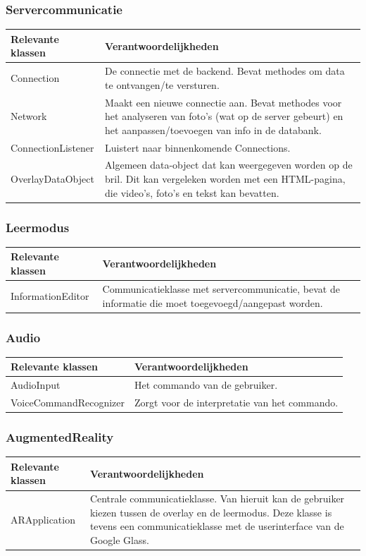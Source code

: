 \documentclass[12pt,a4paper,oneside]{article}
\begin{document}
\subsubsection*{Servercommunicatie}
\begin{longtable}{|p{5cm}|p{11cm}|}
\hline\rowcolor{Gray}
\textbf{Relevante klassen} & \textbf{Verantwoordelijkheden}\\ 
\hline
Connection&De connectie met de backend. Bevat methodes om data te ontvangen/te versturen.\\
\hline
Network&Maakt een nieuwe connectie aan. Bevat methodes voor het analyseren van foto's (wat op de server gebeurt) en het aanpassen/toevoegen van info in de databank.\\
\hline
ConnectionListener&Luistert naar binnenkomende Connections.\\
\hline
OverlayDataObject&Algemeen data-object dat kan weergegeven worden op de bril. Dit kan vergeleken worden met een HTML-pagina, die video's, foto's en tekst kan bevatten.\\
\hline
\end{longtable}

\subsubsection*{Leermodus}
\begin{longtable}{|p{5cm}|p{11cm}|}
\hline\rowcolor{Gray}
\textbf{Relevante klassen} & \textbf{Verantwoordelijkheden}\\ 
\hline
InformationEditor&Communicatieklasse met servercommunicatie, bevat de informatie die moet toegevoegd/aangepast worden.\\
\hline
\end{longtable}

\subsubsection*{Audio}
\begin{longtable}{|p{5cm}|p{11cm}|}
\hline\rowcolor{Gray}
\textbf{Relevante klassen} & \textbf{Verantwoordelijkheden}\\ 
\hline
AudioInput&Het commando van de gebruiker.\\
\hline
VoiceCommandRecognizer&Zorgt voor de interpretatie van het commando.\\
\hline
\end{longtable}


\subsubsection*{AugmentedReality}
\begin{longtable}{|p{5cm}|p{11cm}|}
\hline\rowcolor{Gray}
\textbf{Relevante klassen} & \textbf{Verantwoordelijkheden}\\ 
\hline
ARApplication&Centrale communicatieklasse. Van hieruit kan de gebruiker kiezen tussen de overlay en de leermodus. Deze klasse is tevens een communicatieklasse met de userinterface van de Google Glass.\\
\hline
\end{longtable}
\end{document}
